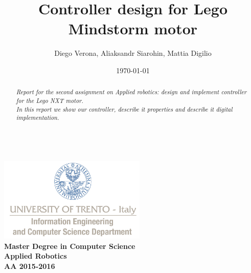 \documentclass[a4paper,12pt,oneside]{article}
\title{Controller design for Lego Mindstorm motor}
\author{Diego Verona, Aliaksandr Siarohin, Mattia Digilio}
\date{\today}
\begin{document}
\makeatletter  %
\begin{titlepage}
      \centering
      ~~~~~~~~~~~~~\\[-30mm]
      \includegraphics[keepaspectratio=true, width=7cm]{bg_eng_1r.jpg} \\[10mm]

     {
     \large \bfseries Master Degree in Computer Science\\[3mm] 
     Applied Robotics\\[3mm]
     AA 2015-2016
     }\\[10mm]


     \vspace{0.5cm}
     {
     \Large \bfseries \textcolor{blue}{\@title} \par
     }
     \vspace{0.5cm}
     \vspace{0.2cm}

     {\large {\@author}}
     \\ \vspace{.2cm}
     \@date

     \vspace{0.6cm}


\begin{abstract}

\textit{
  Report for the second assignment on Applied robotics: design and implement controller for the Lego NXT motor.\\In this report we show our controller, describe it properties and describe it digital implementation.
}


\end{abstract}

\end{titlepage}
\end{document}
